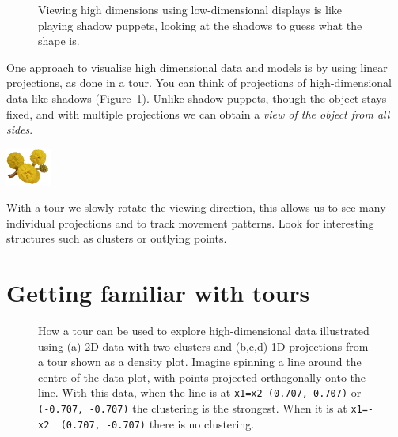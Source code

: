 \documentclass[
  letterpaper,
]{krantz}
\newcommand{\infobox}[1]{%
\noindent\colorbox{info!30}{%
\begin{minipage}{0.98\linewidth}%
    \centering%
    \begin{minipage}[c]{0.15\linewidth} %
      \includegraphics[width=1.5cm]{images/mulga-flowers2.png} %
    \end{minipage}%
    \hfill %
    \begin{minipage}[c]{0.8\linewidth} %
      \bigskip%
      \textsf{#1}%
      \bigskip%
    \end{minipage}%
    \hspace*{3mm}%
  \end{minipage}%
}%
}
\begin{document}
\begin{figure}


\caption{\label{fig-shadow-puppets}Viewing high dimensions using
low-dimensional displays is like playing shadow puppets, looking at the
shadows to guess what the shape is.}

\end{figure}%

One approach to visualise high dimensional data and models is by using
linear projections, as done in a tour. You can think of projections of
high-dimensional data like shadows (Figure~\ref{fig-shadow-puppets}).
Unlike shadow puppets, though the object stays fixed, and with multiple
projections we can obtain a \emph{view of the object from all sides}.

\infobox{With a tour we slowly rotate the viewing direction, this allows us to see many individual projections and to track movement patterns. Look for interesting structures such as clusters or outlying points.}

\section{Getting familiar with tours}\label{getting-familiar-with-tours}

\begin{figure}


\caption{\label{fig-explain-1D-pdf}How a tour can be used to explore
high-dimensional data illustrated using (a) 2D data with two clusters
and (b,c,d) 1D projections from a tour shown as a density plot. Imagine
spinning a line around the centre of the data plot, with points
projected orthogonally onto the line. With this data, when the line is
at \texttt{x1=x2\ (0.707,\ 0.707)} or \texttt{(-0.707,\ -0.707)} the
clustering is the strongest. When it is at
\texttt{x1=-x2\ \ (0.707,\ -0.707)} there is no clustering.
}

\end{figure}%
\end{document}
